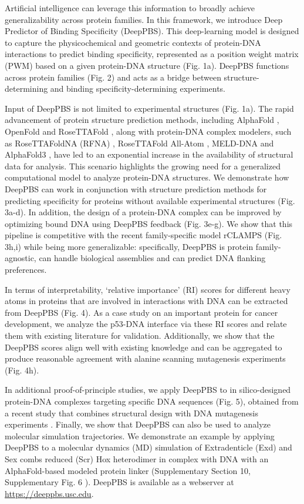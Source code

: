 Artificial intelligence can leverage this information to broadly achieve generalizability across protein families. In this framework, we introduce Deep Predictor of Binding Specificity (DeepPBS). This deep-learning model is designed to capture the physicochemical and geometric contexts of protein-DNA interactions to predict binding specificity, represented as a position weight matrix (PWM) \citep{Stormo2013} based on a given protein-DNA structure (Fig. 1a). DeepPBS functions across protein families (Fig. 2) and acts as a bridge between structure-determining and binding specificity-determining experiments. 
\par
Input of DeepPBS is not limited to experimental structures (Fig. 1a). The rapid advancement of protein structure prediction methods, including AlphaFold \citep{Jumper2021}, OpenFold \citep{Ahdritz2024} and RoseTTAFold \citep{Baek2021}, along with protein-DNA complex modelers, such as RoseTTAFoldNA (RFNA) \citep{baek2024na}, RoseTTAFold All-Atom \citep{Krishna2024}, MELD-DNA \citep{Esmaeeli2023} and AlphaFold3 \citep{Abramson2024}, have led to an exponential increase in the availability of structural data for analysis. This scenario highlights the growing need for a generalized computational model to analyze protein-DNA structures. We demonstrate how DeepPBS can work in conjunction with structure prediction methods for predicting specificity for proteins without available experimental structures (Fig. 3a-d). In addition, the design of a protein-DNA complex can be improved by optimizing bound DNA using DeepPBS feedback (Fig. 3e-g). We show that this pipeline is competitive with the recent family-specific model rCLAMPS \citep{Wetzel2022} (Fig. 3h,i) while being more generalizable: specifically, DeepPBS is protein family-agnostic, can handle biological assemblies and can predict DNA flanking preferences.
\par
In terms of interpretability, ‘relative importance’ (RI) scores for different heavy atoms in proteins that are involved in interactions with DNA can be extracted from DeepPBS (Fig. 4). As a case study on an important protein for cancer development, we analyze the p53-DNA interface via these RI scores and relate them with existing literature for validation. Additionally, we show that the DeepPBS scores align well with existing knowledge and can be aggregated to produce reasonable agreement with alanine scanning mutagenesis experiments \citep{Morrison2001} (Fig. 4h).
\par
In additional proof-of-principle studies, we apply DeepPBS to in silico-designed protein-DNA complexes targeting specific DNA sequences (Fig. 5), obtained from a recent study that combines structural design with DNA mutagenesis experiments \citep{Glasscock2023}. Finally, we show that DeepPBS can also be used to analyze molecular simulation trajectories. We demonstrate an example by applying DeepPBS to a molecular dynamics (MD) simulation of Extradenticle (Exd) and Sex combs reduced (Scr) Hox heterodimer in complex with DNA \citep{Joshi2007} with an AlphaFold-based modeled protein linker (Supplementary Section 10, Supplementary Fig. 6 ). DeepPBS is available as a webserver at \url{https://deeppbs.usc.edu}.
